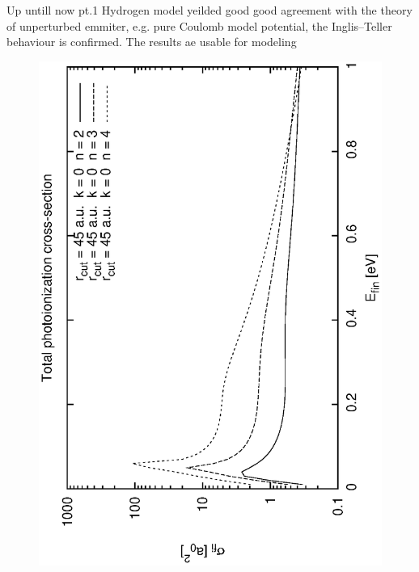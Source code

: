 \documentclass{beamer}
\begin{document}
\begin{frame}{Up untill now pt.1}
    Hydrogen model yeilded good good agreement with the theory of unperturbed emmiter, e.g. pure Coulomb model potential, the Inglis–Teller behaviour is confirmed. The results ae usable for modeling
    
    \begin{figure}
        \includegraphics[scale=0.25,angle=-90]{fig/preseci_2_U0.eps}
    \hfill    

\end{figure}
\end{frame}
\end{document}

